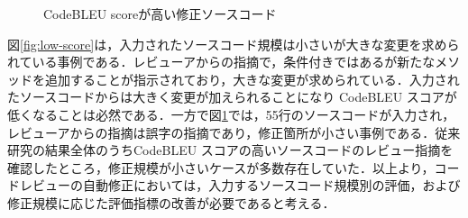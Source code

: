 \documentclass[11pt]{jreport}
\begin{document}
\begin{figure}[H]
   \begin{center}
       \caption{CodeBLEU scoreが高い修正ソースコード}
       \label{fig:high-score}
   \end{center}
\end{figure}

図\ref{fig:low-score}は，入力されたソースコード規模は小さいが大きな変更を求められている事例である．レビューアからの指摘で，条件付きではあるが新たなメソッドを追加することが指示されており，大きな変更が求められている．入力されたソースコードからは大きく変更が加えられることになり CodeBLEU スコアが低くなることは必然である．一方で図\ref{fig:high-score}では，55行のソースコードが入力され，レビューアからの指摘は誤字の指摘であり，修正箇所が小さい事例である．従来研究の結果全体のうちCodeBLEU スコアの高いソースコードのレビュー指摘を確認したところ，修正規模が小さいケースが多数存在していた．以上より，コードレビューの自動修正においては，入力するソースコード規模別の評価，および修正規模に応じた評価指標の改善が必要であると考える．
\end{document}

